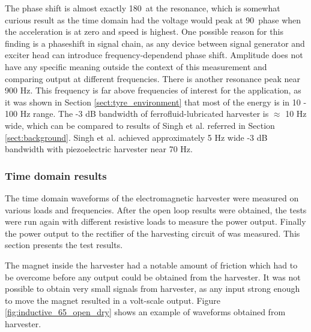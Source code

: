 The phase shift is almost exactly 180\degree \ at the resonance, which is somewhat curious result as the time domain had the voltage would peak at 90\degree \ phase when the acceleration is at zero and speed is highest. One possible reason for this finding is a phaseshift in signal chain, as any device between signal generator and exciter head can introduce frequency-dependend phase shift. Amplitude does not have any specific meaning outside the context of this measurement and comparing output at different frequencies.  There is another resonance peak near 900 Hz. This frequency is far above frequencies of interest for the application, as it was shown in Section \ref{sect:tyre_environment} that most of the energy is in 10 - 100 Hz range. The -3 dB bandwidth of ferrofluid-lubricated harvester is $ \approx $ 10 Hz wide, which can be compared to results of Singh et al. \cite{Singh2012} referred in Section \ref{sect:background}. Singh et al. achieved approximately 5 Hz wide -3 dB bandwidth with piezoelectric harvester near 70 Hz.


\subsubsection{Time domain results}\label{sect:lg_td}
The time domain waveforms of the electromagnetic harvester were measured on various loads and frequencies. After the open loop results were obtained, the tests were run again with different resistive loads to measure the power output. Finally the power output to the rectifier of the harvesting circuit of was measured. This section presents the test results. 

The magnet inside the harvester had a notable amount of friction which had to be overcome before any output could be obtained from the harvester. It was not possible to obtain very small signals from harvester, as any input strong enough to move the magnet resulted in a volt-scale output. Figure \ref{fig:inductive_65_open_dry} shows an example of waveforms obtained from harvester. 

